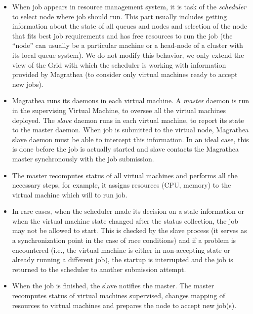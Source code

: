 \documentclass[a4paper]{article}
\begin{document}
\begin{itemize}

\item When job appears in resource management system, it is task of the
\textit{scheduler} to select node where job should run. This part usually
includes getting information about the state of all queues and nodes and
selection of the node that fits best job requirements and has free resources
to run the job (the ``node'' can usually be a particular machine or a
head-node of a cluster with its local queue system). We do not modify this
behavior, we only extend the view of the Grid with which the scheduler is
working with information provided by Magrathea (to consider only virtual
machines ready to accept new jobs).

\item Magrathea runs its daemons in each virtual machine. A \emph{master}
daemon is run in the supervising Virtual Machine, to oversee all the virtual
machines deployed. The \emph{slave} daemon runs in each virtual machine, to
report its state to the master daemon. When job is submitted to the virtual
node, Magrathea slave daemon must be able to intercept this information. In an
ideal case, this is done before the job is actually started and slave contacts
the Magrathea master synchronously with the job submission.

\item The master recomputes status of all virtual machines and performs all
the necessary steps, for example, it assigns resources (CPU, memory) to the
virtual machine which will to run job. 

\item In rare cases, when the scheduler made its decision on a stale
information  or when the virtual machine state changed after the status
collection, the job may not be allowed to start. This is checked by the slave
process (it serves as a synchronization point in the case of race conditions)
and if a problem is encountered (i.e., the virtual machine is either in
non-accepting state or already running a different job), the startup is
interrupted and the job is returned to the scheduler to another submission
attempt.

\item When the job is finished, the slave notifies the master. The master
recomputes status of virtual machines supervised, changes mapping of resources
to virtual machines and prepares the node to accept new job(s).

\end{itemize}
\end{document}
